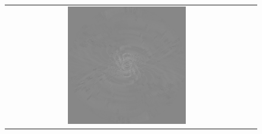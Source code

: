 \documentclass[a4paper,12pt]{article}
\begin{document}
\begin{figure}
\begin{tabular}{cc}
                                                                                                                                                                                                                                                                                                                                                                                                                                                                                                                                                                                                                                                                                                                                                                            \includegraphics[width=0.5\textwidth]{vismaprebefore.pdf} &

\end{tabular}
\end{figure}
\end{document}
